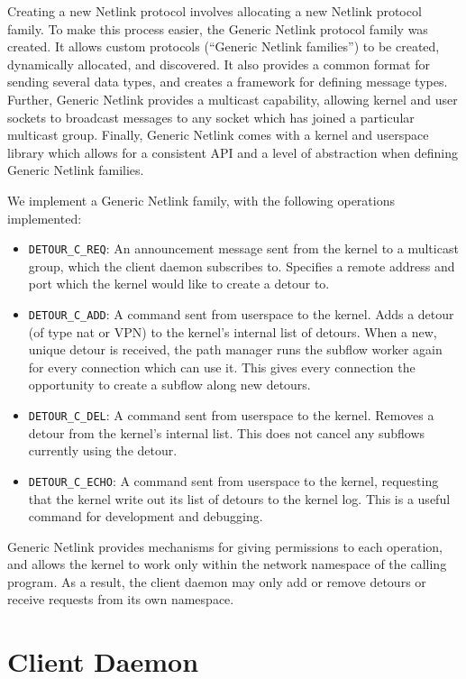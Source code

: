 \documentclass{cwru}
\begin{document}
Creating a new Netlink protocol involves allocating a new Netlink protocol
family. To make this process easier, the Generic Netlink protocol family was
created. It allows custom protocols (``Generic Netlink families'') to be
created, dynamically allocated, and discovered. It also provides a common format
for sending several data types, and creates a framework for defining message
types. Further, Generic Netlink provides a multicast capability, allowing kernel
and user sockets to broadcast messages to any socket which has joined a
particular multicast group. Finally, Generic Netlink comes with a kernel and
userspace library which allows for a consistent API and a level of abstraction
when defining Generic Netlink families.

We implement a Generic Netlink family, with the following operations
implemented:

\begin{itemize}
\item \texttt{DETOUR\_C\_REQ}: An announcement message sent from the kernel to a
  multicast group, which the client daemon subscribes to. Specifies a remote
  address and port which the kernel would like to create a detour to.
\item \texttt{DETOUR\_C\_ADD}: A command sent from userspace to the kernel. Adds
  a detour (of type \ac{nat} or VPN) to the kernel's internal list of detours.
  When a new, unique detour is received, the path manager runs the subflow
  worker again for every connection which can use it. This gives every
  connection the opportunity to create a subflow along new detours.
\item \texttt{DETOUR\_C\_DEL}: A command sent from userspace to the kernel.
  Removes a detour from the kernel's internal list. This does not cancel any
  subflows currently using the detour.
\item \texttt{DETOUR\_C\_ECHO}: A command sent from userspace to the kernel,
  requesting that the kernel write out its list of detours to the kernel log.
  This is a useful command for development and debugging.
\end{itemize}

Generic Netlink provides mechanisms for giving permissions to each operation,
and allows the kernel to work only within the network namespace of the calling
program. As a result, the client daemon may only add or remove detours or
receive requests from its own namespace.

\section{Client Daemon}
\end{document}
